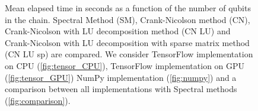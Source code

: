 \documentclass[rmp,10pt,onecolumn,fleqn,notitlepage]{revtex4-1}
\begin{document}
\begin{figure}[H]
\begin{minipage}[c]{0.49\linewidth}
\end{minipage}
\begin{minipage}[c]{0.49\linewidth}
\end{minipage}
\caption{Mean elapsed time in seconds as a function of the number of qubits in the chain. Spectral Method (SM), Crank-Nicolson method (CN),  Crank-Nicolson with LU decomposition method (CN LU) and Crank-Nicolson with LU decomposition with sparse matrix method (CN LU sp) are compared. We consider TensorFlow implementation on CPU (\ref{fig:tensor_CPU}),  TensorFlow implementation on GPU (\ref{fig:tensor_GPU}) NumPy implementation (\ref{fig:numpy}) and a comparison between all implementations with Spectral methods (\ref{fig:comparison}).}
\label{fig:timing}
\end{figure}
\end{document}
